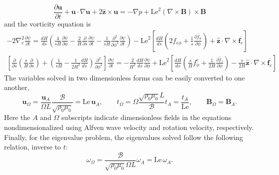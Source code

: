 \[
    \frac{\partial \mathbf{u}}{\partial t} + \mathbf{u}\cdot \nabla \mathbf{u} + 2\hat{\mathbf{z}}\times \mathbf{u} = -\nabla p + \mathrm{Le}^2(\nabla\times\mathbf{B})\times \mathbf{B}
\]
and the vorticity equation is
\[\begin{gathered}
    -2\nabla_e^2 \frac{\partial \psi}{\partial t} = \frac{dH}{ds} \left(\frac{4}{sH}\frac{\partial \psi}{\partial \phi} - \frac{2}{H}\frac{\partial}{\partial s}\frac{\partial \psi}{\partial t} - \frac{1}{sH}\frac{\partial^2}{\partial \phi^2}\frac{\partial \psi}{\partial t}\right) - \mathrm{Le}^2 \left[\frac{dH}{ds}\left(2f_{e\phi} + \frac{1}{s}\frac{\partial \widetilde{f_\phi}}{\partial \phi}\right) + \hat{\mathbf{z}}\cdot \nabla\times \overline{\mathbf{f}_e}\right] \\ 
    \left[\frac{\partial}{\partial s}\left(\frac{s}{H}\frac{\partial}{\partial s}\right) + \left(\frac{1}{sH} - \frac{1}{2H^2} \frac{dH}{ds}\right)\frac{\partial^2}{\partial \phi^2}\right] \frac{\partial \psi}{\partial t} = - \frac{2}{H^2}\frac{dH}{ds} \frac{\partial \psi}{\partial \phi} + \mathrm{Le}^2 \left[\frac{dH}{ds} \left(\frac{s}{H} f_\phi^e + \frac{1}{2H}\frac{\partial \widetilde{f_z}}{\partial \phi}\right) - \frac{s}{2H}\hat{\mathbf{z}}\cdot \nabla\times \overline{\mathbf{f}_e}\right]
\end{gathered}
\]
The variables solved in two dimensionless forms can be easily converted to one another,
\[
    \mathbf{u}_\Omega = \frac{\mathbf{u}_A}{\Omega L} \frac{\mathscr{B}}{\sqrt{\rho_0 \mu_0}} = \mathrm{Le} \, \mathbf{u}_A, \qquad t_\Omega = \Omega \frac{\sqrt{\rho_0 \mu_0} L}{\mathscr{B}} t_A = \frac{t_A}{\mathrm{Le}},\qquad \mathbf{B}_\Omega = \mathbf{B}_A.
\]
Here the $A$ and $\Omega$ subscripts indicate dimensionless fields in the equations nondimensionalized using Alfven wave velocity and rotation velocity, respectively. Finally, for the eigenvalue problem, the eigenvalues solved follow the following relation, inverse to $t$:
\[
    \omega_\Omega = \frac{\mathscr{B}}{\sqrt{\rho_0 \mu_0} \Omega L} \omega_A = \mathrm{Le} \, \omega_A.
\]
